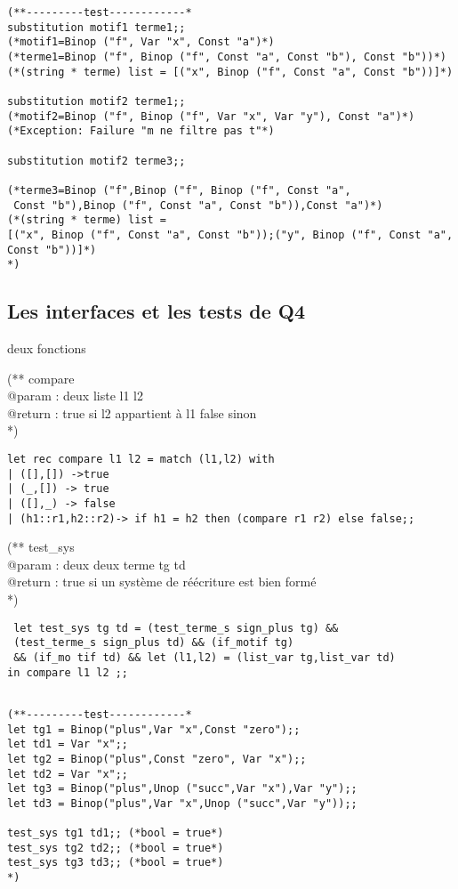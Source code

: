 \documentclass[12pt]{amsart}
\begin{document}
 
\begin{lstlisting}
(**---------test------------*
substitution motif1 terme1;; 
(*motif1=Binop ("f", Var "x", Const "a")*)
(*terme1=Binop ("f", Binop ("f", Const "a", Const "b"), Const "b"))*)
(*(string * terme) list = [("x", Binop ("f", Const "a", Const "b"))]*)

substitution motif2 terme1;;
(*motif2=Binop ("f", Binop ("f", Var "x", Var "y"), Const "a")*)
(*Exception: Failure "m ne filtre pas t"*)

substitution motif2 terme3;;

(*terme3=Binop ("f",Binop ("f", Binop ("f", Const "a",
 Const "b"),Binop ("f", Const "a", Const "b")),Const "a")*)
(*(string * terme) list =
[("x", Binop ("f", Const "a", Const "b"));("y", Binop ("f", Const "a", Const "b"))]*)
*)
 \end{lstlisting}
 
 \subsection{Les interfaces et les tests de Q4}   deux fonctions

(** compare\\
@param  : deux liste l1 l2\\ 
@return : true si l2 appartient à l1 false sinon\\
*)
\begin{lstlisting}
let rec compare l1 l2 = match (l1,l2) with
| ([],[]) ->true
| (_,[]) -> true
| ([],_) -> false
| (h1::r1,h2::r2)-> if h1 = h2 then (compare r1 r2) else false;;

 \end{lstlisting}  
 
 (** test\_sys\\
@param  : deux deux terme tg td \\
@return : true si un système de réécriture est bien formé \\
*)
 \begin{lstlisting}
 let test_sys tg td = (test_terme_s sign_plus tg) && 
 (test_terme_s sign_plus td) && (if_motif tg) 
 && (if_mo tif td) && let (l1,l2) = (list_var tg,list_var td) 
in compare l1 l2 ;;
  \end{lstlisting}  
 
  \begin{lstlisting}

(**---------test------------*
let tg1 = Binop("plus",Var "x",Const "zero");;
let td1 = Var "x";;
let tg2 = Binop("plus",Const "zero", Var "x");;
let td2 = Var "x";;
let tg3 = Binop("plus",Unop ("succ",Var "x"),Var "y");;
let td3 = Binop("plus",Var "x",Unop ("succ",Var "y"));;

test_sys tg1 td1;; (*bool = true*)
test_sys tg2 td2;; (*bool = true*)
test_sys tg3 td3;; (*bool = true*)
*)
  \end{lstlisting}  
  
\end{document}
